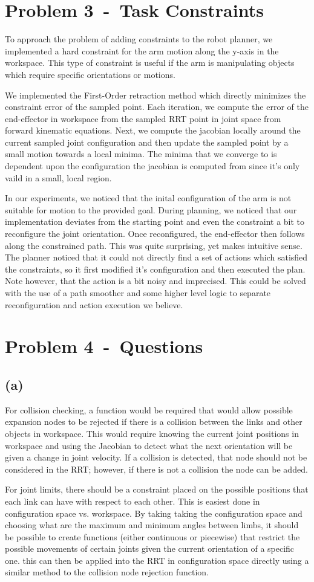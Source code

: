 \documentclass[12pt]{article}
\newcommand{\problem}[2]{\section*{Problem {#1}~-~{#2}}}
\newcommand{\problemPart}[1]{\subsection*{(#1)}}
\begin{document}
\problem{3}{Task Constraints}
\label{sec:problem_3}
To approach the problem of adding constraints to the robot planner, we implemented a hard constraint for the arm motion along the y-axis in the workspace. This type of constraint is useful if the arm is manipulating objects which require specific orientations or motions.

We implemented the First-Order retraction method which directly minimizes the constraint error of the sampled point. Each iteration, we compute the error of the end-effector in workspace from the sampled RRT point in joint space from forward kinematic equations. Next, we compute the jacobian locally around the current sampled joint configuration and then update the sampled point by a small motion towards a local minima. The minima that we converge to is dependent upon the configuration the jacobian is computed from since it's only vaild in a small, local region.

In our experiments, we noticed that the inital configuration of the arm is not suitable for motion to the provided goal. During planning, we noticed that our implementation deviates from the starting point and even the constraint a bit to reconfigure the joint orientation. Once reconfigured, the end-effector then follows along the constrained path. This was quite surprising, yet makes intuitive sense. The planner noticed that it could not directly find a set of actions which satisfied the constraints, so it first modified it's configuration and then executed the plan. Note however, that the action is a bit noisy and imprecised. This could be solved with the use of a path smoother and some higher level logic to separate reconfiguration and action execution we believe.

\problem{4}{Questions}
\label{sec:problem_4}
\problemPart{a}
For collision checking, a function would be required that would allow possible expansion nodes to be rejected if there is a collision between the links and other objects in workspace. This would require knowing the current joint positions in workspace and using the Jacobian to detect what the next orientation will be given a change in joint velocity. If a collision is detected, that node should not be considered in the RRT; however, if there is not a collision the node can be added.

For joint limits, there should be a constraint placed on the possible positions that each link can have with respect to each other. This is easiest done in configuration space vs. workspace. By taking taking the configuration space and choosing what are the maximum and minimum angles between limbs, it should be possible to create functions (either continuous or piecewise) that restrict the possible movements of certain joints given the current orientation of a specific one. this can then be applied into the RRT in configuration space directly using a similar method to the collision node rejection function.
\end{document}
